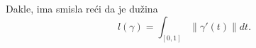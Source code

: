 \documentclass[preview]{standalone}
\begin{document}
\begin{center}
Dakle, ima smisla reći da je dužina 
        \[l(\gamma) = \int_{[0,1]} \lVert \gamma'(t)\rVert dt.\]
\end{center}
\end{document}
